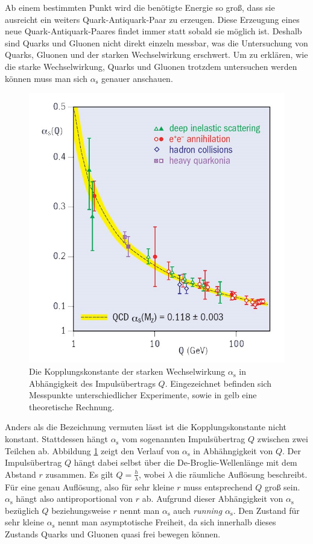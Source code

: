 Ab einem bestimmten Punkt wird die ben\"otigte Energie so gro{\ss}, dass sie ausreicht ein weiters Quark-Antiquark-Paar zu erzeugen.
Diese Erzeugung eines neue Quark-Antiquark-Paares findet immer statt sobald sie m\"oglich ist.
Deshalb sind Quarks und Gluonen nicht direkt einzeln messbar, was die Untersuchung von Quarks, Gluonen und der starken Wechselwirkung erschwert.
Um zu erkl\"aren, wie die starke Wechselwirkung, Quarks und Gluonen trotzdem untersuchen werden k\"onnen muss man sich $\alpha_\text{s}$ genauer anschauen. 
\newline
\begin{figure}[thp]
\centering
\includegraphics[width=.5\linewidth]{alpha_s.jpg}
\caption{Die Kopplungskonstante der starken Wechselwirkung $\alpha_\text{s}$ in Abh\"angigkeit des Impulsübertrags $Q$. Eingezeichnet befinden sich Messpunkte unterschiedlicher Experimente, sowie in gelb eine theoretische Rechnung.
\cite{article:1}}
\label{fig:alpha_2}
\end{figure}
Anders als die Bezeichnung vermuten l\"asst ist die Kopplungskonstante nicht konstant.
Stattdessen h\"angt $\alpha_\text{s}$ vom sogenannten Impulsübertrag $Q$ zwischen zwei Teilchen ab.
Abbildung \ref{fig:alpha_2} zeigt den Verlauf von $\alpha_\text{s}$ in Abh\"ahngigkeit von $Q$.
Der Impulsübertrag $Q$ h\"angt dabei selbst \"uber die De-Broglie-Wellenl\"ange mit dem Abstand $r$ zusammen.
Es gilt $Q = \frac{h}{\lambda}$, wobei $\lambda$ die r\"aumliche Aufl\"osung beschreibt.
F\"ur eine genau Aufl\"osung, also f\"ur  sehr kleine $r$ muss entsprechend $Q$ gro{\ss} sein.
$\alpha_\text{s}$ h\"angt also antiproportional von $r$ ab.
Aufgrund dieser Abh\"angigkeit von $\alpha_\text{s}$ bez\"uglich $Q$ beziehungsweise $r$ nennt man $\alpha_\text{s}$ auch \textit{running $\alpha_\text{s}$}. 
Den Zustand f\"ur sehr kleine $\alpha_\text{s}$ nennt man asymptotische Freiheit, da sich innerhalb dieses Zustands Quarks und Gluonen quasi frei bewegen k\"onnen.
